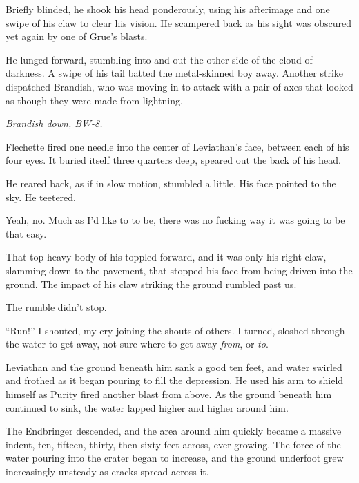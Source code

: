 Briefly blinded, he shook his head ponderously, using his afterimage and one swipe of his claw to clear his vision.  He scampered back as his sight was obscured yet again by one of Grue's blasts.



He lunged forward, stumbling into and out the other side of the cloud of darkness.  A swipe of his tail batted the metal-skinned boy away.  Another strike dispatched Brandish, who was moving in to attack with a pair of axes that looked as though they were made from lightning.



\emph{Brandish down, BW-8.}



Flechette fired one needle into the center of Leviathan's face, between each of his four eyes.  It buried itself three quarters deep, speared out the back of his head.



He reared back, as if in slow motion, stumbled a little.  His face pointed to the sky.  He teetered.



Yeah, no.  Much as I'd like to to be, there was no fucking way it was going to be that easy.



That top-heavy body of his toppled forward, and it was only his right claw, slamming down to the pavement, that stopped his face from being driven into the ground.  The impact of his claw striking the ground rumbled past us.



The rumble didn't stop.



``Run!'' I shouted, my cry joining the shouts of others.  I turned, sloshed through the water to get away, not sure where to get away \emph{from}, or \emph{to}.



Leviathan and the ground beneath him sank a good ten feet, and water swirled and frothed as it began pouring to fill the depression.  He used his arm to shield himself as Purity fired another blast from above.  As the ground beneath him continued to sink, the water lapped higher and higher around him.



The Endbringer descended, and the area around him quickly became a massive indent, ten, fifteen, thirty, then sixty feet across, ever growing.  The force of the water pouring into the crater began to increase, and the ground underfoot grew increasingly unsteady as cracks spread across it.



